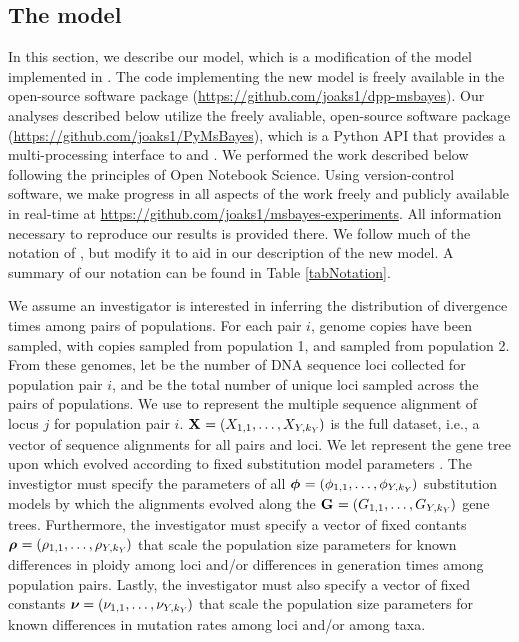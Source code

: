 \documentclass[letterpaper,12pt]{article}
\begin{document}
\begin{linenumbers}
\subsection*{The model}
In this section, we describe our model, which is a modification of the model
implemented in \msb \citep{Huang2011,Oaks2012}.
The code implementing the new model is freely available in the open-source
software package \dppmsbayes
(\href{https://github.com/joaks1/dpp-msbayes}{https://github.com/joaks1/dpp-msbayes}).
Our analyses described below utilize the freely avaliable, open-source software
package \pymsbayes (\href{https://github.com/joaks1/PyMsBayes}{https://github.com/joaks1/PyMsBayes}),
which is a Python API that provides a multi-processing interface to \msb and
\dppmsbayes.
We performed the work described below following the principles of
Open Notebook Science.
Using version-control software, we make progress in all aspects of the work
freely and publicly available in real-time at
\href{https://github.com/joaks1/msbayes-experiments}{https://github.com/joaks1/msbayes-experiments}.
All information necessary to reproduce our results is provided there.
We follow much of the notation of \citet{Oaks2012}, but modify it to
aid in our description of the new model.
A summary of our notation can be found in Table \ref{tabNotation}.

We assume an investigator is interested in inferring the distribution
of divergence times among \npairs{} pairs of populations.
For each pair $i$,  genome copies have been sampled, with
 copies sampled from population 1, and 
sampled from population 2.
From these genomes, let  be the number of DNA sequence loci collected
for population pair $i$, and \nlociTotal be the total number of unique loci
sampled across the \npairs{} pairs of populations.
We use  to represent the multiple sequence alignment of
locus $j$ for population pair $i$.
$\alignmentVector = (\alignment{1}{1}, \ldots,
    \alignment{\npairs{}}{\nloci{\npairs{}}})$
is the full dataset,
i.e., a vector of sequence alignments for all pairs and loci.
We let  represent the gene tree upon which 
evolved according to fixed \hky substitution model parameters .
The investigtor must specify the parameters of all
$\hkyModelVector = (\hkyModel{1}{1}, \ldots,
\hkyModel{\npairs{}}{\nloci{\npairs{}}})$
substitution models by which the alignments evolved along the
$\geneTreeVector = (\geneTree{1}{1}, \ldots,
\geneTree{\npairs{}}{\nloci{\npairs{}}})$
gene trees.
Furthermore, the investigator must specify a vector of fixed contants
$\ploidyScalarVector = (\ploidyScalar{1}{1}, \ldots,
\ploidyScalar{\npairs{}}{\nloci{\npairs{}}})$
that scale the population size parameters for known differences in ploidy among
loci and/or differences in generation times among population pairs.
Lastly, the investigator must also specify a vector of fixed constants
$\mutationRateScalarConstantVector = (\mutationRateScalarConstant{1}{1},
\ldots, \mutationRateScalarConstant{\npairs{}}{\nloci{\npairs{}}})$
that scale the population size parameters for known differences in
mutation rates among loci and/or among taxa.


\end{linenumbers}
\end{document}
